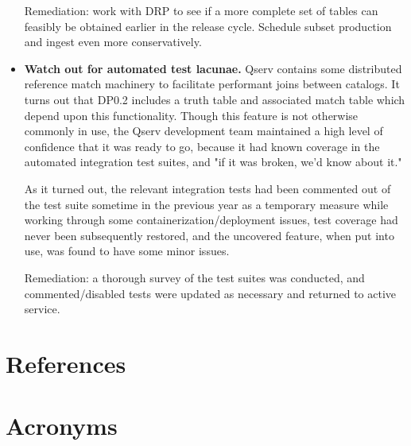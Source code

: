 \documentclass[OPS,authoryear,toc]{lsstdoc}
\begin{document}
\begin{itemize}
  Remediation: work with DRP to see if a more complete set of tables can feasibly be obtained earlier in the
  release cycle. Schedule subset production and ingest even more conservatively.

\item
  \textbf{Watch out for automated test lacunae.}  Qserv contains some distributed reference match machinery to
  facilitate performant joins between catalogs.  It turns out that DP0.2 includes a truth table and associated
  match table which depend upon this functionality.  Though this feature is not otherwise commonly in use, the
  Qserv development team maintained a high level of confidence that it was ready to go, because it had known
  coverage in the automated integration test suites, and "if it was broken, we'd know about it."

  As it turned out, the relevant integration tests had been commented out of the test suite sometime in the
  previous year as a temporary measure while working through some containerization/deployment issues, test
  coverage had never been subsequently restored, and the uncovered feature, when put into use, was found to
  have some minor issues.

  Remediation: a thorough survey of the test suites was conducted, and commented/disabled tests were updated
  as necessary and returned to active service.

\end{itemize}


\appendix

\section{References}\label{sec:bib}
\renewcommand{\refname}{} %


\section{Acronyms}\label{sec:acronyms}

\end{document}
